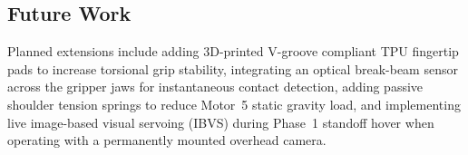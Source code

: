 \documentclass[11pt,a4paper]{article}
\begin{document}
\subsection{Future Work}
Planned extensions include adding 3D-printed V-groove compliant TPU fingertip pads to increase torsional grip stability, integrating an optical break-beam sensor across the gripper jaws for instantaneous contact detection, adding passive shoulder tension springs to reduce Motor~5 static gravity load, and implementing live image-based visual servoing (IBVS) during Phase~1 standoff hover when operating with a permanently mounted overhead camera.
\end{document}
